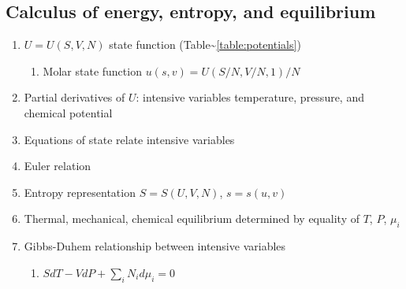 \documentclass[11pt]{article}
\begin{document}
\subsection{Calculus of energy, entropy, and equilibrium}
\label{sec:orgacab086}
\begin{enumerate}
\item \(U = U(S,V,N)\) state function (Table\textasciitilde{}\ref{table:potentials})
\begin{enumerate}
\item Molar state function \(u(s,v)= U(S/N,V/N,1)/N\)
\end{enumerate}
\item Partial derivatives of \(U\): intensive variables temperature, pressure, and chemical potential
\item Equations of state relate intensive variables
\item Euler relation
\item Entropy representation \(S = S(U,V,N)\), \(s=s(u,v)\)
\item Thermal, mechanical, chemical equilibrium determined by equality of \(T\), \(P\), \(\mu_i\)
\item Gibbs-Duhem relationship between intensive variables
\begin{enumerate}
\item \(SdT -VdP+\sum_i N_id\mu_i=0\)
\end{enumerate}
\end{enumerate}
\end{document}
